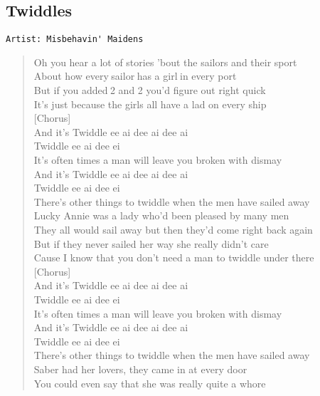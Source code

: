 \documentclass[11pt]{article}
\begin{document}
\subsection{Twiddles}
\label{sec:org3a3a7dd}
\begin{verbatim}
Artist: Misbehavin' Maidens
\end{verbatim}
\begin{verse}
Oh you hear a lot of stories 'bout the sailors and their sport\\
About how every sailor has a girl in every port\\
But if you added 2 and 2 you’d figure out right quick\\
It's just because the girls all have a lad on every ship\\
\vspace*{1em}
[Chorus]\\
And it's Twiddle ee ai dee ai dee ai\\
Twiddle ee ai dee ei\\
It’s often times a man will leave you broken with dismay\\
And it's Twiddle ee ai dee ai dee ai\\
Twiddle ee ai dee ei\\
There's other things to twiddle when the men have sailed away\\
Lucky Annie was a lady who'd been pleased by many men\\
They all would sail away but then they'd come right back again\\
But if they never sailed her way she really didn't care\\
Cause I know that you don't need a man to twiddle under there\\
\vspace*{1em}
[Chorus]\\
And it's Twiddle ee ai dee ai dee ai\\
Twiddle ee ai dee ei\\
It’s often times a man will leave you broken with dismay\\
And it’s Twiddle ee ai dee ai dee ai\\
Twiddle ee ai dee ei\\
There's other things to twiddle when the men have sailed away\\
\vspace*{1em}
Saber had her lovers, they came in at every door\\
You could even say that she was really quite a whore\\

\end{verse}
\end{document}
